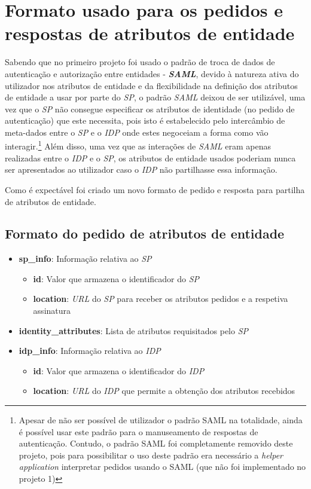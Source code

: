 \section{Formato usado para os pedidos e respostas de atributos de entidade}

\quad Sabendo que no primeiro projeto foi usado o padrão de troca de dados de autenticação e autorização entre entidades - \textbf{\textit{SAML}}, devido à natureza ativa do utilizador nos atributos de entidade e da flexibilidade na definição dos atributos de entidade a usar por parte do \textit{SP}, o padrão \textit{SAML} deixou de ser utilizável, uma vez que o \textit{SP} não consegue especificar os atributos de identidade (no pedido de autenticação)  que este necessita, pois isto é estabelecido pelo intercâmbio de meta-dados entre o \textit{SP} e o \textit{IDP} onde estes negoceiam a forma como vão interagir.\footnote{Apesar de não ser possível de utilizador o padrão SAML na totalidade, ainda é possível usar este padrão para o manuseamento de respostas de autenticação. Contudo, o padrão SAML foi completamente removido deste projeto, pois para possibilitar o uso deste padrão era necessário a \textit{helper application} interpretar pedidos usando o SAML (que não foi implementado no projeto 1)} Além disso, uma vez que as interações de \textit{SAML} eram apenas realizadas entre o \textit{IDP} e o \textit{SP}, os atributos de entidade usados poderiam nunca ser apresentados ao utilizador caso o \textit{IDP} não partilhasse essa informação.


\quad Como é expectável foi criado um novo formato de pedido e resposta para partilha de atributos de entidade.

\subsection{Formato do pedido de atributos de entidade}

\begin{itemize}
    \item \textbf{sp\_info}: Informação relativa ao \textit{SP}
    \begin{itemize}
        \item \textbf{id}: Valor que armazena o identificador do \textit{SP}
        \item \textbf{location}: \textit{URL} do \textit{SP} para receber os atributos pedidos e a respetiva assinatura
    \end{itemize}
    \item \textbf{identity\_attributes}: Lista de atributos requisitados pelo \textit{SP}
    \item \textbf{idp\_info}: Informação relativa ao \textit{IDP}
    \begin{itemize}
        \item \textbf{id}: Valor que armazena o identificador do \textit{IDP}
        \item \textbf{location}: \textit{URL} do \textit{IDP} que permite a obtenção dos atributos recebidos
    \end{itemize}
\end{itemize}


